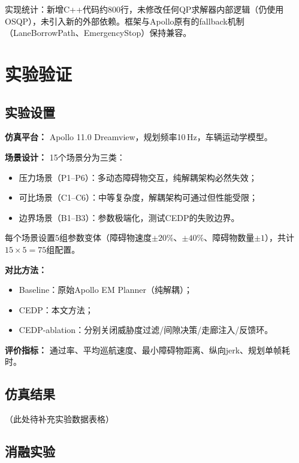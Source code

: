 \documentclass[a4paper,11pt]{article}
\begin{document}
实现统计：新增C++代码约800行，未修改任何QP求解器内部逻辑（仍使用OSQP），未引入新的外部依赖。框架与Apollo原有的fallback机制（LaneBorrowPath、EmergencyStop）保持兼容。

\section{实验验证}

\subsection{实验设置}

\textbf{仿真平台：} Apollo 11.0 Dreamview，规划频率10\,Hz，车辆运动学模型。

\textbf{场景设计：} 15个场景分为三类：
\begin{itemize}
  \item 压力场景（P1--P6）：多动态障碍物交互，纯解耦架构必然失效；
  \item 可比场景（C1--C6）：中等复杂度，解耦架构可通过但性能受限；
  \item 边界场景（B1--B3）：参数极端化，测试CEDP的失败边界。
\end{itemize}

每个场景设置5组参数变体（障碍物速度$\pm 20\%$、$\pm 40\%$、障碍物数量$\pm 1$），共计$15 \times 5 = 75$组配置。

\textbf{对比方法：}
\begin{itemize}
  \item Baseline：原始Apollo EM Planner（纯解耦）；
  \item CEDP：本文方法；
  \item CEDP-ablation：分别关闭威胁度过滤/间隙决策/走廊注入/反馈环。
\end{itemize}

\textbf{评价指标：} 通过率、平均巡航速度、最小障碍物距离、纵向jerk、规划单帧耗时。

\subsection{仿真结果}

（此处待补充实验数据表格）

\subsection{消融实验}
\end{document}
